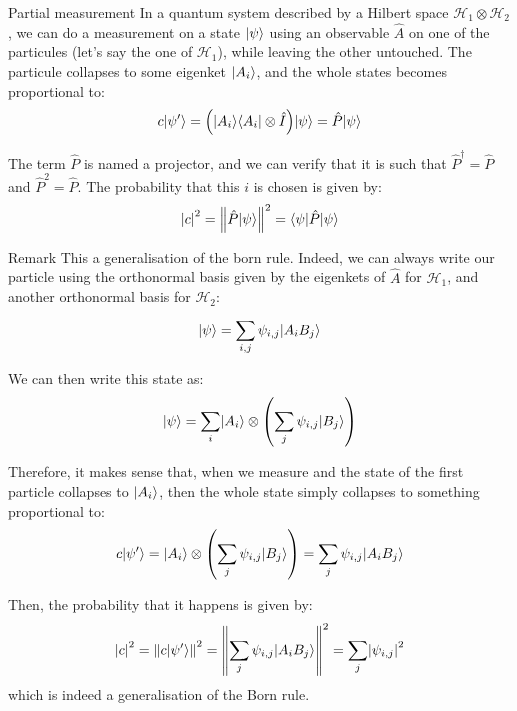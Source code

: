 \documentclass[a4paper]{article}
\begin{document}
\begin{parag}{Partial measurement}
    In a quantum system described by a Hilbert space $\mathcal{H}_1 \otimes \mathcal{H}_2$, we can do a measurement on a state $\ket{\psi}$ using an observable $\hat{A}$ on one of the particules (let's say the one of $\mathcal{H}_1$), while leaving the other untouched. The particule collapses to some eigenket $\ket{A_i}$, and the whole states becomes proportional to: 
    \[c \ket{\psi'} = \left(\ket{A_i}\bra{A_i} \otimes \hat{I}\right) \ket{\psi} = \hat{P} \ket{\psi}\]

    The term $\hat{P}$ is named a projector, and we can verify that it is such that $\hat{P}^{\dagger} = \hat{P}$ and $\hat{P}^2 = \hat{P}$. The probability that this $i$ is chosen is given by: 
    \[\left|c\right|^2 = \left\|\hat{P} \ket{\psi}\right\|^2 = \bra{\psi} \hat{P} \ket{\psi}\]

    \begin{subparag}{Remark}
        This a generalisation of the born rule. Indeed, we can always write our particle using the orthonormal basis given by the eigenkets of $\hat{A}$ for $\mathcal{H}_1$, and another orthonormal basis for $\mathcal{H}_2$: 
        \[\ket{\psi} = \sum_{i, j}^{} \psi_{i,j} \ket{A_i B_j}\]
        
        We can then write this state as: 
        \[\ket{\psi} = \sum_{i}^{} \ket{A_i} \otimes \left(\sum_{j}^{} \psi_{i, j} \ket{B_j}\right)\]
        
        Therefore, it makes sense that, when we measure and the state of the first particle collapses to $\ket{A_i}$, then the whole state simply collapses to something proportional to: 
        \[c\ket{\psi'} = \ket{A_i} \otimes \left(\sum_{j}^{} \psi_{i, j} \ket{B_j}\right) = \sum_{j}^{} \psi_{i, j}\ket{A_i B_j}\]

        Then, the probability that it happens is given by: 
        \[\left|c\right|^2 = \left\|c \ket{\psi'}\right\|^2 = \left\|\sum_{j}^{} \psi_{i, j}\ket{A_i B_j}\right\|^2 = \sum_{j} \left|\psi_{i, j}\right|^2\]
        which is indeed a generalisation of the Born rule.
    \end{subparag}
\end{parag}
\end{document}
